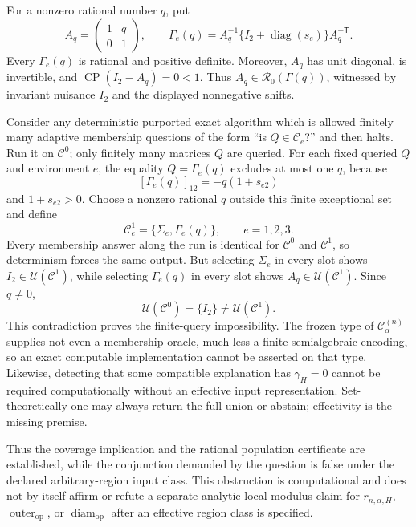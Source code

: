 For a nonzero rational number \(q\), put
\[
A_q=\begin{pmatrix}1&q\\0&1\end{pmatrix},\qquad
\Gamma_e(q)=A_q^{-1}\{I_2+\operatorname{diag}(s_e)\}A_q^{-\mathsf T}.
\]
Every \(\Gamma_e(q)\) is rational and positive definite.  Moreover, \(A_q\) has unit diagonal, is invertible, and \(\operatorname{CP}(I_2-A_q)=0<1\).  Thus \(A_q\in\mathcal R_0(\Gamma(q))\), witnessed by invariant nuisance \(I_2\) and the displayed nonnegative shifts.

Consider any deterministic purported exact algorithm which is allowed finitely many adaptive membership questions of the form ``is \(Q\in\mathcal C_e\)?'' and then halts.  Run it on \(\mathcal C^0\); only finitely many matrices \(Q\) are queried.  For each fixed queried \(Q\) and environment \(e\), the equality \(Q=\Gamma_e(q)\) excludes at most one \(q\), because
\[
[\Gamma_e(q)]_{12}=-q(1+s_{e2})
\]
and \(1+s_{e2}>0\).  Choose a nonzero rational \(q\) outside this finite exceptional set and define
\[
\mathcal C^1_e=\{\Sigma_e,\Gamma_e(q)\},\qquad e=1,2,3.
\]
Every membership answer along the run is identical for \(\mathcal C^0\) and \(\mathcal C^1\), so determinism forces the same output.  But selecting \(\Sigma_e\) in every slot shows \(I_2\in\mathcal U(\mathcal C^1)\), while selecting \(\Gamma_e(q)\) in every slot shows \(A_q\in\mathcal U(\mathcal C^1)\).  Since \(q\ne0\),
\[
\mathcal U(\mathcal C^0)=\{I_2\}\ne\mathcal U(\mathcal C^1).
\]
This contradiction proves the finite-query impossibility.  The frozen type of \(\mathcal C^{(n)}_\alpha\) supplies not even a membership oracle, much less a finite semialgebraic encoding, so an exact computable implementation cannot be asserted on that type.  Likewise, detecting that some compatible explanation has \(\gamma_H=0\) cannot be required computationally without an effective input representation.  Set-theoretically one may always return the full union or abstain; effectivity is the missing premise.

Thus the coverage implication and the rational population certificate are established, while the conjunction demanded by the question is false under the declared arbitrary-region input class.  This obstruction is computational and does not by itself affirm or refute a separate analytic local-modulus claim for \(r_{n,\alpha,H}\), \(\operatorname{outer}_{\mathrm{op}}\), or \(\operatorname{diam}_{\mathrm{op}}\) after an effective region class is specified.